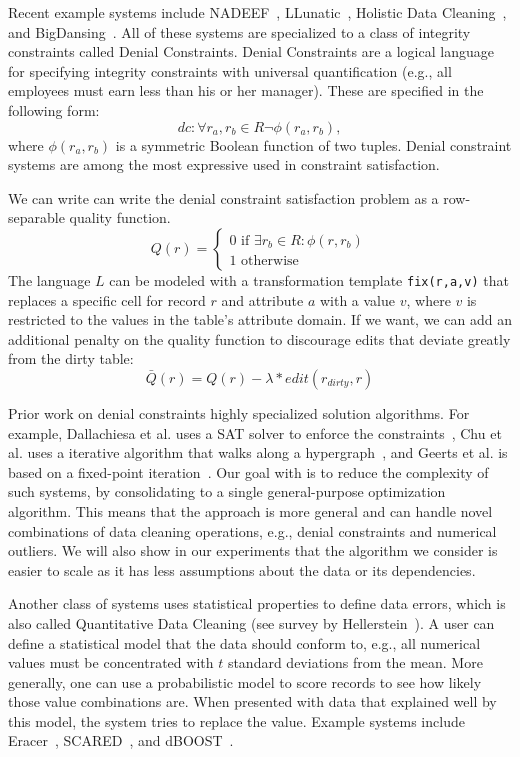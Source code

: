 Recent example systems include NADEEF~\cite{DBLP:conf/sigmod/DallachiesaEEEIOT13}, LLunatic~\cite{geerts2013llunatic}, Holistic Data Cleaning~\cite{chu2013holistic}, and BigDansing~\cite{khayyat2015bigdansing}.
All of these systems are specialized to a class of integrity constraints called Denial Constraints.
Denial Constraints are a logical language for specifying integrity constraints with universal quantification (e.g., all employees must earn less than his or her manager).
These are specified in the following form:
\[
dc: \forall r_a, r_b \in R \neg \phi(r_a, r_b),
\]
where $\phi(r_a, r_b)$ is a symmetric Boolean function of two tuples.
Denial constraint systems are among the most expressive used in constraint satisfaction.

We can write can write the denial constraint satisfaction problem as a row-separable quality function.
\[Q(r) =
\begin{cases}
0 \text{ if } \exists r_b \in R : \phi(r, r_b) \\
1 \text{ otherwise}
\end{cases}\]
The language $L$ can be modeled with a transformation template \texttt{fix(r,a,v)} that replaces a specific cell for record $r$ and attribute $a$ with a value $v$, where $v$ is restricted to the values in the table's attribute domain.
If we want, we can add an additional penalty on the quality function to discourage edits that deviate greatly from the dirty table:
\[\bar{Q}(r) = Q(r) - \lambda * edit(r_{dirty}, r)\]

Prior work on denial constraints highly specialized solution algorithms.
For example, Dallachiesa et al. uses a SAT solver to enforce the constraints~\cite{DBLP:conf/sigmod/DallachiesaEEEIOT13}, Chu et al. uses a iterative algorithm that walks along a hypergraph~\cite{chu2013holistic}, and Geerts et al. is based on a fixed-point iteration~\cite{geerts2013llunatic}.
Our goal with \sys is to reduce the complexity of such systems, by consolidating to a single general-purpose optimization algorithm.
This means that the approach is more general and can handle novel combinations of data cleaning operations, e.g., denial constraints and numerical outliers.
We will also show in our experiments that the algorithm we consider is easier to scale as it has less assumptions about the data or its dependencies.

Another class of systems uses statistical properties to define data errors, which is also called Quantitative Data Cleaning (see survey by Hellerstein~\cite{hellerstein2008quantitative}).
A user can define a statistical model that the data should conform to, e.g., all numerical values must be concentrated with $t$ standard deviations from the mean. 
More generally, one can use a probabilistic model to score records to see how likely those value combinations are.
When presented with data that explained well by this model, the system tries to replace the value.
Example systems include Eracer~\cite{eracer}, SCARED~\cite{yakout2013don}, and dBOOST~\cite{pit2016outlier}.

